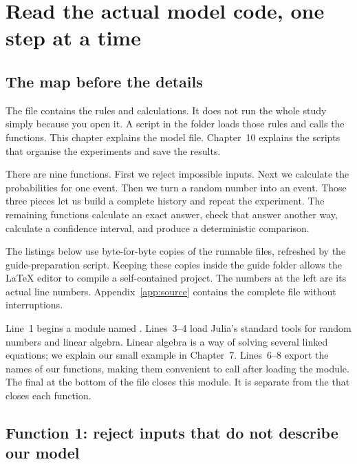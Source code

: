 \chapter{Read the actual model code, one step at a time}
\label{chap:code}

\section{The map before the details}
The file  contains the rules and calculations. It does not run the whole study simply because you open it. A script in the  folder loads those rules and calls the functions. This chapter explains the model file. Chapter~10 explains the scripts that organise the experiments and save the results.

There are nine functions. First we reject impossible inputs. Next we calculate the probabilities for one event. Then we turn a random number into an event. Those three pieces let us build a complete history and repeat the experiment. The remaining functions calculate an exact answer, check that answer another way, calculate a confidence interval, and produce a deterministic comparison.

The listings below use byte-for-byte copies of the runnable files, refreshed by the guide-preparation script. Keeping these copies inside the guide folder allows the LaTeX editor to compile a self-contained project. The numbers at the left are its actual line numbers. Appendix~\ref{app:source} contains the complete file without interruptions.



Line~1 begins a module named . Lines~3--4 load Julia's standard tools for random numbers and linear algebra. Linear algebra is a way of solving several linked equations; we explain our small example in Chapter~7. Lines~6--8 export the names of our functions, making them convenient to call after loading the module. The final  at the bottom of the file closes this module. It is separate from the  that closes each function.

\section{Function 1: reject inputs that do not describe our model}


